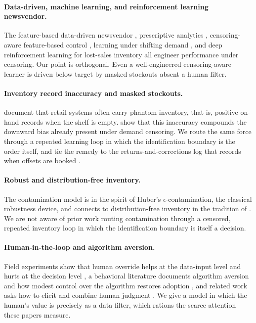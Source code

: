 \documentclass[11pt]{article}
\theoremstyle{plain}
\begin{document}
\paragraph{Data-driven, machine learning, and reinforcement learning newsvendor.}
The feature-based data-driven newsvendor \citep{ban2019bigdata}, prescriptive
analytics \citep{bertsimas2020predictive,elmachtoub2022smart}, censoring-aware
feature-based control \citep{ding2024feature}, learning under shifting demand
\citep{chen2021shifting}, and deep reinforcement learning for lost-sales inventory
\citep{gijsbrechts2022deeprl} all engineer performance under censoring. Our point
is orthogonal. Even a well-engineered censoring-aware learner is driven below
target by masked stockouts absent a human filter.

\paragraph{Inventory record inaccuracy and masked stockouts.}
\citet{dehoratius2008empirical,dehoratius2008retail} document that retail systems
often carry phantom inventory, that is, positive on-hand records when the shelf is
empty. \citet{mersereau2015censored,chen2015visibility} show that this inaccuracy
compounds the downward bias already present under demand censoring. We route the
same force through a repeated learning loop in which the identification boundary is
the order itself, and tie the remedy to the returns-and-corrections log that records
when offsets are booked \citep{kesavan2025judgmental}.

\paragraph{Robust and distribution-free inventory.}
The contamination model is in the spirit of Huber's
\citeyearpar{huber1964robust} $\epsilon$-contamination, the classical robustness
device, and connects to distribution-free inventory in the tradition of
\citet{scarf1958minmax}. We are not aware of prior work routing contamination
through a censored, repeated inventory loop in which the identification boundary is
itself a decision.

\paragraph{Human-in-the-loop and algorithm aversion.}
Field experiments show that human override helps at the data-input level and hurts
at the decision level \citep{kesavan2025judgmental,kesavan2020override}, a
behavioral literature documents algorithm aversion and how modest control over the
algorithm restores adoption \citep{dietvorst2018overcoming}, and related work asks
how to elicit and combine human judgment \citep{ibrahim2021eliciting}. We give a
model in which the human's value is precisely as a data filter, which rations the
scarce attention these papers measure.
\end{document}
